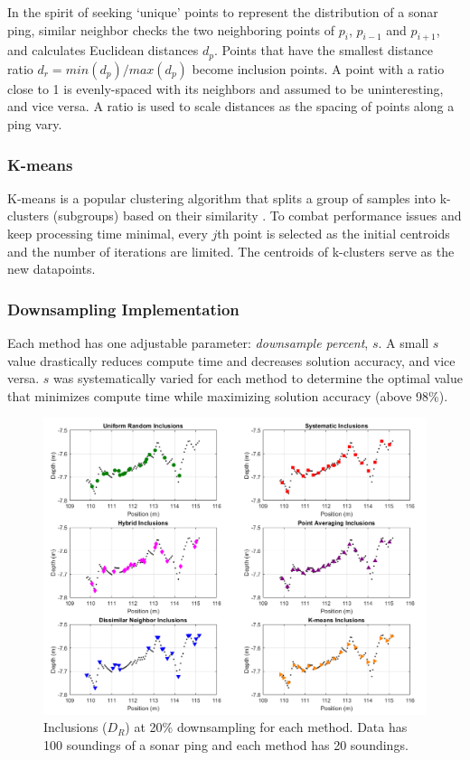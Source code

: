 In the spirit of seeking `unique' points to represent the distribution of a sonar ping, similar neighbor checks the two neighboring points of $p_i$, $p_{i-1}$ and $p_{i+1}$, and calculates Euclidean distances $d_p$. Points that have the smallest distance ratio $d_r = min(d_p) / max(d_p)$ become inclusion points. A point with a ratio close to 1 is evenly-spaced with its neighbors and assumed to be uninteresting, and vice versa. A ratio is used to scale distances as the spacing of points along a ping vary. 

\subsubsection{K-means}

K-means is a popular clustering algorithm that splits a group of samples into k-clusters (subgroups) based on their similarity \cite{kmeans_inefficient}. To combat performance issues \cite{kmeans_inefficient} and keep processing time minimal, every $j$th point is selected as the initial centroids and the number of iterations are limited. The centroids of k-clusters serve as the new datapoints. 

\subsubsection{Downsampling Implementation}

Each method has one adjustable parameter: \textit{downsample percent}, $s$. A small $s$ value drastically reduces compute time and decreases solution accuracy, and vice versa. $s$ was systematically varied for each method to determine the optimal value that minimizes compute time while maximizing solution accuracy (above 98\%).

\begin{figure}[!ht]
    \begin{center}
       \includegraphics[width=1\textwidth]{images/eachDownsampleMethodSelectionsFig2.png}
    \end{center}
    \caption{Inclusions ($D_R$) at 20\% downsampling for each method. Data has 100 soundings of a sonar ping and each method has 20 soundings.} \label{fig:downsample_datapoints_examples}
\end{figure}

